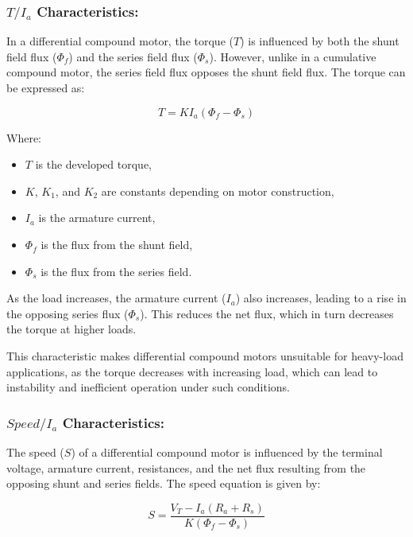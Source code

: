 \documentclass[a4paper,12pt]{article}
\begin{document}
			\subsubsection{$T / I_a$ Characteristics:}
			
			In a differential compound motor, the torque (\(T\)) is influenced by both the shunt field flux (\(\Phi_f\)) and the series field flux (\(\Phi_s\)). However, unlike in a cumulative compound motor, the series field flux opposes the shunt field flux. The torque can be expressed as:
			
			\begin{equation}
				T = K I_a (\Phi_f - \Phi_s)
			\end{equation}
			
			
			
			Where:
			\begin{itemize}
				\item \(T\) is the developed torque,
				\item \(K\), \(K_1\), and \(K_2\) are constants depending on motor construction,
				\item \(I_a\) is the armature current,
				\item \(\Phi_f\) is the flux from the shunt field,
				\item \(\Phi_s\) is the flux from the series field.
			\end{itemize}
			
			As the load increases, the armature current (\(I_a\)) also increases, leading to a rise in the opposing series flux (\(\Phi_s\)). This reduces the net flux, which in turn decreases the torque at higher loads. 
			
			This characteristic makes differential compound motors unsuitable for heavy-load applications, as the torque decreases with increasing load, which can lead to instability and inefficient operation under such conditions.
			\subsubsection{$Speed / I_a$ Characteristics:}
	
	The speed (\(S\)) of a differential compound motor is influenced by the terminal voltage, armature current, resistances, and the net flux resulting from the opposing shunt and series fields. The speed equation is given by:
	
	\begin{equation}
		S = \frac{V_T - I_a (R_a + R_s)}{K (\Phi_f - \Phi_s)}
	\end{equation}
	
\end{document}
